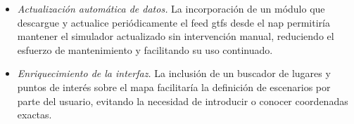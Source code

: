 \begin{itemize}
  \item \textit{Actualización automática de datos.} La incorporación de un módulo que descargue y actualice periódicamente el feed \gls{gtfs} desde el \acrlong{nap} permitiría mantener el simulador actualizado sin intervención manual, reduciendo el esfuerzo de mantenimiento y facilitando su uso continuado.\newline
  
  \item \textit{Enriquecimiento de la interfaz.} La inclusión de un buscador de lugares y puntos de interés sobre el mapa facilitaría la definición de escenarios por parte del usuario, evitando la necesidad de introducir o conocer coordenadas exactas.
\end{itemize}
